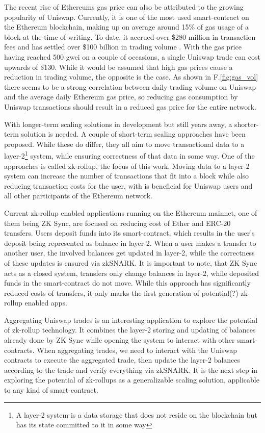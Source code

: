 \documentclass[../../thesis.tex]{subfiles}
\begin{document}
The recent rise of Ethereums gas price \cite{gasprice} can also be attributed to the growing popularity of Uniswap. Currently, it is one of the most used smart-contract on the Ethereum blockchain, making up on average around 15\% of gas \cite{eth_gas_guzzlers} usage of a block at the time of writing. To date, it accrued over \$280 million in transaction fees \cite{uniswap_tx_fees} and has settled over \$100 billion in trading volume \cite{cummulative_vol}. With the gas price having reached 500 gwei on a couple of occasions, a single Uniswap trade can cost upwards of \$130. While it would be assumed that high gas prices cause a reduction in trading volume, the opposite is the case. As shown in F.\ref{fig:gas_vol} there seems to be a strong correlation between daily trading volume on Uniswap and the average daily Ethereum gas price, so reducing gas consumption by Uniswap transactions should result in a reduced gas price for the entire network.

With longer-term scaling solutions in development but still years away, a shorter-term solution is needed. A couple of short-term scaling approaches have been proposed. While these do differ, they all aim to move transactional data to a layer-2\footnote{A layer-2 system is a data storage that does not reside on the blockchain but has its state committed to it in some way} system, while ensuring correctness of that data in some way. One of the approaches is called zk-rollup, the focus of this work. Moving data to a layer-2 system can increase the number of transactions that fit into a block while also reducing transaction costs for the user, with is beneficial for Uniswap users and all other participants of the Ethereum network. 

Current zk-rollup enabled applications running on the Ethereum mainnet, one of them being ZK Sync, are focused on reducing cost of Ether and ERC-20 transfers. Users deposit funds into its smart-contract, which results in the user's deposit being represented as balance in layer-2. When a user makes a transfer to another user, the involved balances get updated in layer-2, while the correctness of these updates is ensured via zkSNARK. It is important to note, that ZK Sync acts as a closed system, transfers only change balances in layer-2, while deposited funds in the smart-contract do not move. While this approach has significantly reduced costs of transfers, it only marks the first generation of potential(?) zk-rollup enabled apps.

Aggregating Uniswap trades is an interesting application to explore the potential of zk-rollup technology. It combines the layer-2 storing and updating of balances already done by ZK Sync while opening the system to interact with other smart-contracts. When aggregating trades, we need to interact with the Uniswap contracts to execute the aggregated trade, then update the layer-2 balances according to the trade and verify everything via zkSNARK. It is the next step in exploring the potential of zk-rollups as a generalizable scaling solution, applicable to any kind of smart-contract. 
\end{document}
